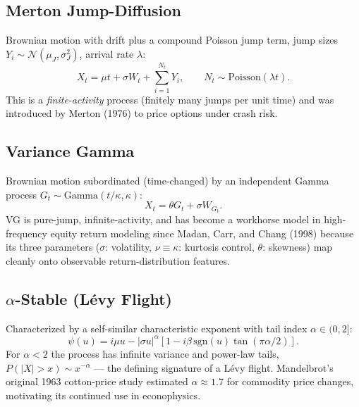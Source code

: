 \documentclass[11pt]{article}
\begin{document}
\subsection{Merton Jump-Diffusion}
Brownian motion with drift plus a compound Poisson jump term, jump sizes $Y_i\sim\mathcal{N}(\mu_J,\sigma_J^2)$, arrival rate $\lambda$:
\begin{equation}
X_t = \mu t + \sigma W_t + \sum_{i=1}^{N_t} Y_i, \qquad N_t \sim \text{Poisson}(\lambda t).
\end{equation}
This is a \emph{finite-activity} process (finitely many jumps per unit time) and was introduced by Merton (1976) to price options under crash risk.

\subsection{Variance Gamma}
Brownian motion subordinated (time-changed) by an independent Gamma process $G_t\sim\text{Gamma}(t/\kappa,\kappa)$:
\begin{equation}
X_t = \theta G_t + \sigma W_{G_t}.
\end{equation}
VG is pure-jump, infinite-activity, and has become a workhorse model in high-frequency equity return modeling since Madan, Carr, and Chang (1998) because its three parameters ($\sigma$: volatility, $\nu\equiv\kappa$: kurtosis control, $\theta$: skewness) map cleanly onto observable return-distribution features.

\subsection{$\alpha$-Stable (Lévy Flight)}
Characterized by a self-similar characteristic exponent with tail index $\alpha\in(0,2]$:
\begin{equation}
\psi(u) = i\mu u - |\sigma u|^\alpha\left[1-i\beta\,\text{sgn}(u)\tan(\pi\alpha/2)\right].
\end{equation}
For $\alpha<2$ the process has infinite variance and power-law tails, $P(|X|>x)\sim x^{-\alpha}$ — the defining signature of a Lévy flight. Mandelbrot's original 1963 cotton-price study estimated $\alpha\approx 1.7$ for commodity price changes, motivating its continued use in econophysics.
\end{document}
